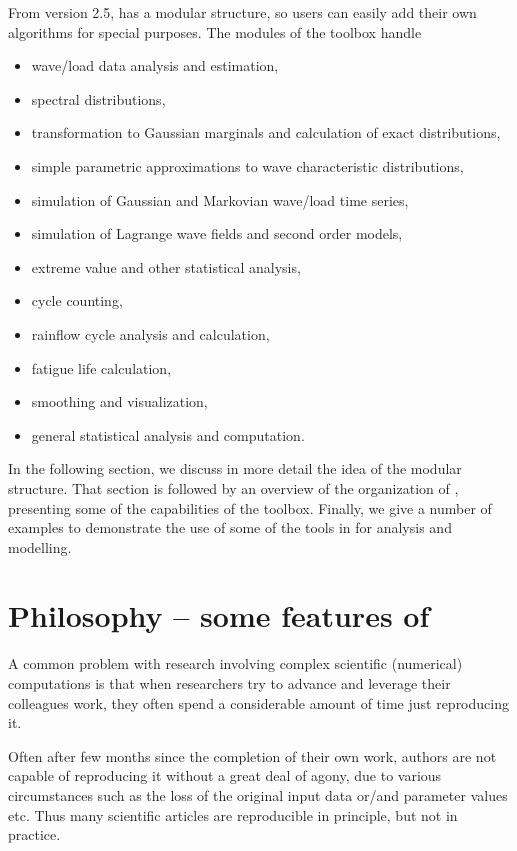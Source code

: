 From version 2.5, \progname{} has a modular structure, 
so users can easily add their
own algorithms for special purposes. The modules of the toolbox handle
\begin{itemize}\setlength\itemsep{-1mm}
  \item wave/load data analysis and estimation,
  \item spectral distributions,
  \item transformation to Gaussian marginals and calculation of
exact distributions,
  \item simple parametric approximations to wave
        characteristic distributions,
  \item simulation of Gaussian and Markovian wave/load time series,
  \item simulation of Lagrange wave fields and second order models, 
  \item extreme value and other statistical analysis,
  \item cycle counting,
  \item rainflow cycle analysis and calculation,
  \item fatigue life calculation,
  \item smoothing and visualization,
  \item general statistical analysis and computation.
\end{itemize}

In the following section, we discuss in more detail the idea
of the modular structure. That section is followed by an overview of
the organization of \progname{}, presenting some of the capabilities of the
toolbox. Finally, we give a number of examples to demonstrate the use
of some of the tools in \progname{} for analysis and modelling.

\section{Philosophy -- some features of \progname{}}\label{sec:philosophy}

A common problem with research involving complex scientific (numerical)
computations is that when researchers try to advance and leverage their
colleagues work, they often spend a considerable amount of time just
reproducing it.

Often after few months since the completion of their own work, authors
are not capable of reproducing it without a great deal of agony, due to
various circumstances such as the loss of the original input data
or/and parameter values etc.  Thus many scientific articles are
reproducible in principle, but not in practice.

